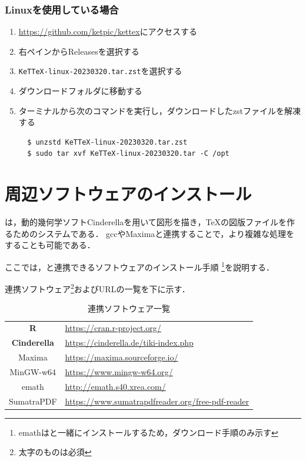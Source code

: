 \subsubsection{Linuxを使用している場合}
\begin{enumerate}
    \item \url{https://github.com/ketpic/kettex}にアクセスする
    \item 右ペインからReleasesを選択する
    \item \verb|KeTTeX-linux-20230320.tar.zst|を選択する
    \item ダウンロードフォルダに移動する
    \item ターミナルから次のコマンドを実行し，ダウンロードしたzstファイルを解凍する
    \begin{lstlisting}
  $ unzstd KeTTeX-linux-20230320.tar.zst
  $ sudo tar xvf KeTTeX-linux-20230320.tar -C /opt
    \end{lstlisting}
\end{enumerate}

\newpage

\section{周辺ソフトウェアのインストール}

{\ketcindy}は，動的幾何学ソフトCinderellaを用いて図形を描き，{\TeX}の図版ファイルを作るためのシステムである．
gccやMaximaと連携することで，より複雑な処理をすることも可能である．

ここでは，{\ketcindy}と連携できるソフトウェアのインストール手順
\footnote{emathは{\ketcindy}と一緒にインストールするため，ダウンロード手順のみ示す}を説明する．

連携ソフトウェア\footnote{太字のものは必須}およびURLの一覧を下に示す．

\begin{table}[h]
    \centering
    \caption{連携ソフトウェア一覧}
    \label{tab:download}
    \begin{tabular}{c||l}
        \textbf{R}           & \url{https://cran.r-project.org/}\\
        \textbf{Cinderella}  & \url{https://cinderella.de/tiki-index.php}\\
        Maxima      & \url{https://maxima.sourceforge.io/}\\
        MinGW-w64   & \url{https://www.mingw-w64.org/}\\
        emath       & \url{http://emath.s40.xrea.com/}\\
        SumatraPDF  & \url{https://www.sumatrapdfreader.org/free-pdf-reader}
    \end{tabular}
\end{table}

